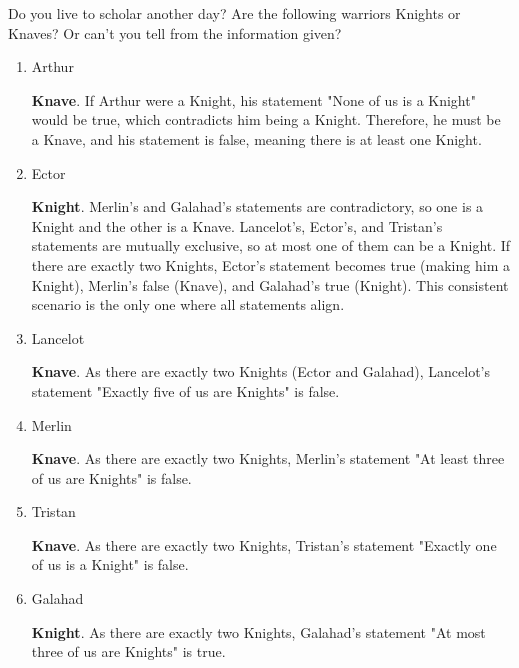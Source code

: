 \begin{enumerate}
  Do you live to scholar another day? Are the following warriors Knights or Knaves? Or can't you tell from the information given?
    \begin{enumerate}[label=\arabic*.]
      \item Arthur\\
      \begin{subanswer}
        \textbf{Knave}. If Arthur were a Knight, his statement "None of us is a Knight" would be true, which contradicts him being a Knight. Therefore, he must be a Knave, and his statement is false, meaning there is at least one Knight.
      \end{subanswer}
      \item Ector\\
      \begin{subanswer}
        \textbf{Knight}. Merlin's and Galahad's statements are contradictory, so one is a Knight and the other is a Knave. Lancelot's, Ector's, and Tristan's statements are mutually exclusive, so at most one of them can be a Knight. If there are exactly two Knights, Ector's statement becomes true (making him a Knight), Merlin's false (Knave), and Galahad's true (Knight). This consistent scenario is the only one where all statements align.
      \end{subanswer}
      \item Lancelot\\
      \begin{subanswer}
        \textbf{Knave}. As there are exactly two Knights (Ector and Galahad), Lancelot's statement "Exactly five of us are Knights" is false.
      \end{subanswer}
      \item Merlin\\
      \begin{subanswer}
        \textbf{Knave}. As there are exactly two Knights, Merlin's statement "At least three of us are Knights" is false.
      \end{subanswer}
      \item Tristan\\
      \begin{subanswer}
        \textbf{Knave}. As there are exactly two Knights, Tristan's statement "Exactly one of us is a Knight" is false.
      \end{subanswer}
      \item Galahad\\
      \begin{subanswer}
        \textbf{Knight}. As there are exactly two Knights, Galahad's statement "At most three of us are Knights" is true.
      \end{subanswer}
    \end{enumerate}



\end{enumerate}
